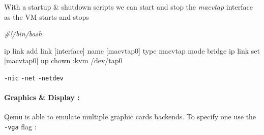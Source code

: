 \documentclass[
  14pt,
  english,
  a4paper,
]{scrreprt}
\newenvironment{Shaded}{}{}
\newcommand{\CommentTok}[1]{\textcolor[rgb]{0.38,0.63,0.69}{\textit{#1}}}
\newcommand{\ExtensionTok}[1]{#1}
\newcommand{\FunctionTok}[1]{\textcolor[rgb]{0.02,0.16,0.49}{#1}}
\newcommand{\NormalTok}[1]{#1}
\begin{document}
With a startup \& shutdown scripts we can start and stop the
\emph{macvtap} interface as the VM starts and stops

\begin{Shaded}
\begin{Highlighting}[]
\CommentTok{\#!/bin/bash}

\ExtensionTok{ip}\NormalTok{ link add link [interface] name [macvtap0] type macvtap mode bridge}
\ExtensionTok{ip}\NormalTok{ link set [macvtap0] up}
\FunctionTok{chown}\NormalTok{ :kvm /dev/tap0}
\end{Highlighting}
\end{Shaded}

\texttt{-nic} \texttt{-net} \texttt{-netdev}

\hypertarget{graphics-display}{%
\paragraph*{Graphics \& Display :}\label{graphics-display}}

Qemu is able to emulate multiple graphic cards backends. To specify one
use the \texttt{-vga} flag :
\end{document}
